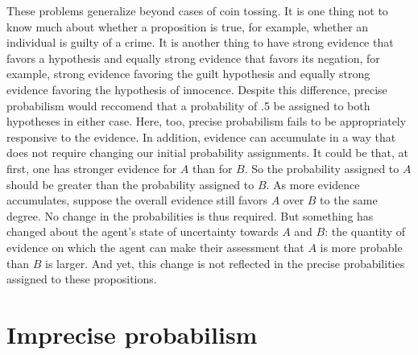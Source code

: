 \documentclass[
  letterpaper,
  DIV=11,
  numbers=noendperiod]{scrartcl}
\begin{document}
These problems generalize beyond cases of coin tossing. It is one thing
not to know much about whether a proposition is true, for example,
whether an individual is guilty of a crime. It is another thing to have
strong evidence that favors a hypothesis and equally strong evidence
that favors its negation, for example, strong evidence favoring the
guilt hypothesis and equally strong evidence favoring the hypothesis of
innocence. Despite this difference, precise probabilism would reccomend
that a probability of .5 be assigned to both hypotheses in either case.
Here, too, precise probabilism fails to be appropriately responsive to
the evidence. In addition, evidence can accumulate in a way that does
not require changing our initial probability assignments. It could be
that, at first, one has stronger evidence for \(A\) than for \(B\). So
the probability assigned to \(A\) should be greater than the probability
assigned to \(B\). As more evidence accumulates, suppose the overall
evidence still favors \(A\) over \(B\) to the same degree. No change in
the probabilities is thus required. But something has changed about the
agent's state of uncertainty towards \(A\) and \(B\): the quantity of
evidence on which the agent can make their assessment that \(A\) is more
probable than \(B\) is larger. And yet, this change is not reflected in
the precise probabilities assigned to these propositions.

\hypertarget{imprecise-probabilism}{%
\section{Imprecise probabilism}\label{imprecise-probabilism}}

\label{sec:imprecise-probabilism}
\end{document}
